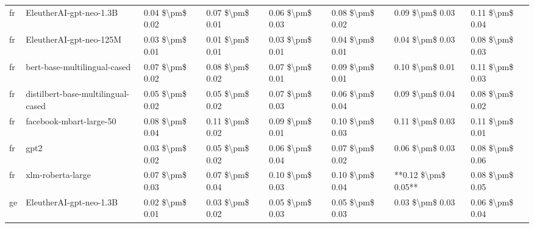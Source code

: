 \begin{tabular}{llllllll}
      fr &            EleutherAI-gpt-neo-1.3B & 0.04 \$\textbackslash pm\$ 0.02 &           0.07 \$\textbackslash pm\$ 0.01 &       0.06 \$\textbackslash pm\$ 0.03 &        0.08 \$\textbackslash pm\$ 0.02 &                         0.09 \$\textbackslash pm\$ 0.03 &     0.11 \$\textbackslash pm\$ 0.04 \\
      fr &            EleutherAI-gpt-neo-125M & 0.03 \$\textbackslash pm\$ 0.01 &           0.01 \$\textbackslash pm\$ 0.01 &       0.03 \$\textbackslash pm\$ 0.01 &        0.04 \$\textbackslash pm\$ 0.01 &                         0.04 \$\textbackslash pm\$ 0.03 &     0.08 \$\textbackslash pm\$ 0.03 \\
      fr &       bert-base-multilingual-cased & 0.07 \$\textbackslash pm\$ 0.02 &           0.08 \$\textbackslash pm\$ 0.02 &       0.07 \$\textbackslash pm\$ 0.01 &        0.09 \$\textbackslash pm\$ 0.01 &                         0.10 \$\textbackslash pm\$ 0.01 &     0.11 \$\textbackslash pm\$ 0.03 \\
      fr & distilbert-base-multilingual-cased & 0.05 \$\textbackslash pm\$ 0.02 &           0.05 \$\textbackslash pm\$ 0.02 &       0.07 \$\textbackslash pm\$ 0.03 &        0.06 \$\textbackslash pm\$ 0.04 &                         0.09 \$\textbackslash pm\$ 0.04 &     0.08 \$\textbackslash pm\$ 0.02 \\
      fr &            facebook-mbart-large-50 & 0.08 \$\textbackslash pm\$ 0.04 &           0.11 \$\textbackslash pm\$ 0.02 &       0.09 \$\textbackslash pm\$ 0.01 &        0.10 \$\textbackslash pm\$ 0.03 &                         0.11 \$\textbackslash pm\$ 0.03 &     0.11 \$\textbackslash pm\$ 0.01 \\
      fr &                               gpt2 & 0.03 \$\textbackslash pm\$ 0.02 &           0.05 \$\textbackslash pm\$ 0.02 &       0.06 \$\textbackslash pm\$ 0.04 &        0.07 \$\textbackslash pm\$ 0.02 &                         0.06 \$\textbackslash pm\$ 0.03 &     0.08 \$\textbackslash pm\$ 0.06 \\
      fr &                  xlm-roberta-large & 0.07 \$\textbackslash pm\$ 0.03 &           0.07 \$\textbackslash pm\$ 0.04 &       0.10 \$\textbackslash pm\$ 0.03 &        0.10 \$\textbackslash pm\$ 0.04 &                     **0.12 \$\textbackslash pm\$ 0.05** &     0.08 \$\textbackslash pm\$ 0.05 \\
      ge &            EleutherAI-gpt-neo-1.3B & 0.02 \$\textbackslash pm\$ 0.01 &           0.03 \$\textbackslash pm\$ 0.02 &       0.05 \$\textbackslash pm\$ 0.03 &        0.05 \$\textbackslash pm\$ 0.03 &                         0.03 \$\textbackslash pm\$ 0.03 &     0.06 \$\textbackslash pm\$ 0.04 \\

\end{tabular}
